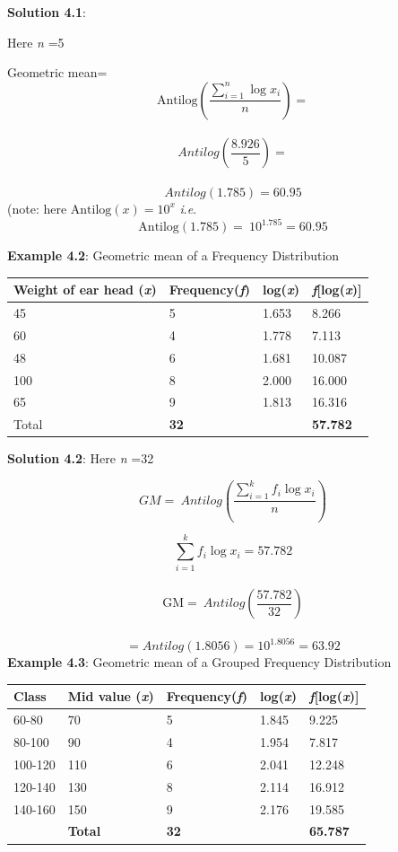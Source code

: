 \documentclass[
]{book}
\begin{document}
\textbf{Solution 4.1}:

Here \emph{n} =5

Geometric mean=\\
\[\text{Antilog}\left( \frac{\sum_{i = 1}^{n}{\log x_{i}}}{n} \right) =\]\\
\[Antilog\left( \frac{8.926}{5} \right) =\]\\
\[ Antilog(1.785) = 60.95\]
(note: here \(\text{Antilog}\left( x \right) = 10^{x}\) \emph{i}.\emph{e}.
\[\text{Antilog}\left( 1.785 \right) = \ 10^{1.785} = 60.95\]

\textbf{Example 4.2}: Geometric mean of a Frequency Distribution

\begin{longtable}[]{@{}llll@{}}
\toprule
Weight of ear head (\emph{x}) & Frequency(\emph{f}) & log(\emph{x}) & \emph{f}{[}log(\emph{x}){]} \\
\midrule
\endhead
45 & 5 & 1.653 & 8.266 \\
60 & 4 & 1.778 & 7.113 \\
48 & 6 & 1.681 & 10.087 \\
100 & 8 & 2.000 & 16.000 \\
65 & 9 & 1.813 & 16.316 \\
Total & \textbf{32} & & \textbf{57.782} \\
\bottomrule
\end{longtable}

\textbf{Solution 4.2}:
Here \emph{n} =32

\[GM = \ Antilog\left( \frac{\sum_{i = 1}^{k}{{f_{i}\log}x_{i}}}{n} \right)\]

\[{\sum_{i = 1}^{k}{{f_{i}\log}x_{i}} = 57.782
}\]\\
\[{\text{GM} = \ Antilog\left( \frac{57.782}{32} \right)  }\]\\
\[{= Antilog\left( 1.8056 \right)= 10^{1.8056} = 63.92}\]
\textbf{Example 4.3}: Geometric mean of a Grouped Frequency Distribution

\begin{longtable}[]{@{}lllll@{}}
\toprule
Class & Mid value (\emph{x}) & Frequency(\emph{f}) & log(\emph{x}) & \emph{f}{[}log(\emph{x}){]} \\
\midrule
\endhead
60-80 & 70 & 5 & 1.845 & 9.225 \\
80-100 & 90 & 4 & 1.954 & 7.817 \\
100-120 & 110 & 6 & 2.041 & 12.248 \\
120-140 & 130 & 8 & 2.114 & 16.912 \\
140-160 & 150 & 9 & 2.176 & 19.585 \\
& \textbf{Total} & \textbf{32} & & \textbf{65.787} \\
\bottomrule
\end{longtable}
\end{document}
